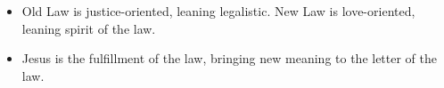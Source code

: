 \documentclass[11pt]{article}
\begin{document}
\begin{itemize}
	\item Old Law is justice-oriented, leaning legalistic.  New Law is love-oriented,
		leaning spirit of the law.
	\item Jesus is the fulfillment of the law, bringing new meaning to the letter
		of the law.
\end{itemize}
\end{document}
